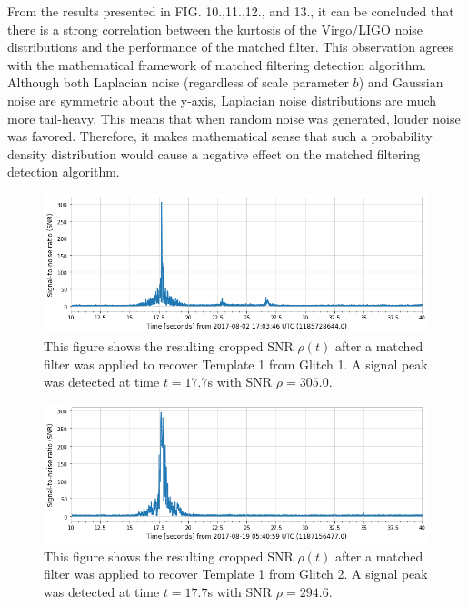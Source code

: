 \documentclass[reprint,
letterpaper,
 amsmath,amssymb,
 aps,
]{revtex4-2}
\begin{document}
From the results presented in FIG. 10.,11.,12., and 13., it can be concluded that there is a strong correlation between the kurtosis of the Virgo/LIGO noise distributions and the performance of the matched filter. This observation agrees with the mathematical framework of matched filtering detection algorithm. Although both Laplacian noise (regardless of scale parameter $b$) and Gaussian noise are symmetric about the y-axis, Laplacian noise distributions are much more tail-heavy. This means that when random noise was generated, louder noise was favored. Therefore, it makes mathematical sense that such a probability density distribution would cause a negative effect on the matched filtering detection algorithm.

\begin{figure}[h]
\caption{This figure shows the resulting cropped SNR $\rho(t)$ after a matched filter was applied to recover Template 1 from Glitch 1. A signal peak was detected at time $t = 17.7$s with SNR $\rho = 305.0$.}
\includegraphics[scale = .33]{glitch loud 69 template 1.png}
\centering
\end{figure}

\begin{figure}[h]
\caption{This figure shows the resulting cropped SNR $\rho(t)$ after a matched filter was applied to recover Template 1 from Glitch 2. A signal peak was detected at time $t = 17.7$s with SNR $\rho = 294.6$.}
\includegraphics[scale = .33]{glitch loud 02 template 1.png}
\centering
\end{figure}
\end{document}
